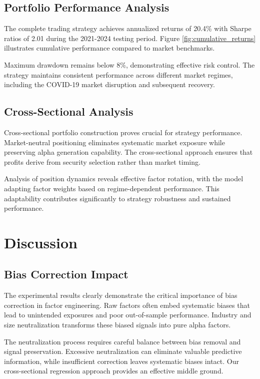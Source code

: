 \documentclass[conference]{IEEEtran}
\begin{document}
\subsection{Portfolio Performance Analysis}

The complete trading strategy achieves annualized returns of 20.4\% with Sharpe ratios of 2.01 during the 2021-2024 testing period. Figure \ref{fig:cumulative_returns} illustrates cumulative performance compared to market benchmarks.

Maximum drawdown remains below 8\%, demonstrating effective risk control. The strategy maintains consistent performance across different market regimes, including the COVID-19 market disruption and subsequent recovery.

\subsection{Cross-Sectional Analysis}

Cross-sectional portfolio construction proves crucial for strategy performance. Market-neutral positioning eliminates systematic market exposure while preserving alpha generation capability. The cross-sectional approach ensures that profits derive from security selection rather than market timing.

Analysis of position dynamics reveals effective factor rotation, with the model adapting factor weights based on regime-dependent performance. This adaptability contributes significantly to strategy robustness and sustained performance.

\section{Discussion}

\subsection{Bias Correction Impact}

The experimental results clearly demonstrate the critical importance of bias correction in factor engineering. Raw factors often embed systematic biases that lead to unintended exposures and poor out-of-sample performance. Industry and size neutralization transforms these biased signals into pure alpha factors.

The neutralization process requires careful balance between bias removal and signal preservation. Excessive neutralization can eliminate valuable predictive information, while insufficient correction leaves systematic biases intact. Our cross-sectional regression approach provides an effective middle ground.
\end{document}
